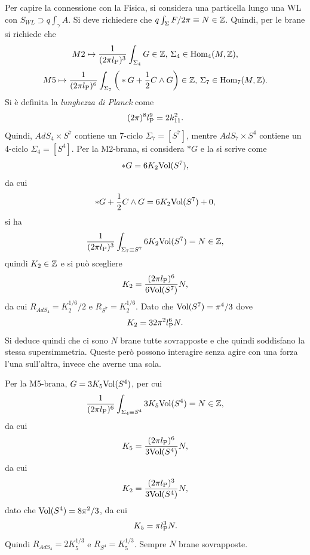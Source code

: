 Per capire la connessione con la Fisica, si considera una particella lungo una WL con $S_{WL} \supset q\int_\gamma A$. Si deve richiedere che $q\int_\Sigma F/2\pi \equiv N \in \mathbb{Z}$. Quindi, per le brane si richiede che 
\begin{equation}
    M2 \mapsto \frac{1}{(2\pi l_{\mathrm{P}})^3}\int_{\Sigma_4} G \in \mathbb{Z},\,\Sigma_4 \in \mathrm{Hom_{4}}(M,\mathbb{Z}),
\end{equation}
\begin{equation}
    M5 \mapsto \frac{1}{(2\pi l_{\mathrm{P}})^6}\int_{\Sigma_7} \bigg(*G + \frac{1}{2}C \wedge G\bigg) \in \mathbb{Z},\,\Sigma_7 \in \mathrm{Hom_{7}}(M,\mathbb{Z}).
\end{equation}
Si è definita la \emph{lunghezza di Planck} come 
\begin{equation}
    (2\pi)^8l_{\mathrm{P}}^9 = 2k_{11}^2.
\end{equation}
Quindi, $AdS_4 \times S^7$ contiene un 7-ciclo $\Sigma_7 = [S^7]$, mentre $AdS_7 \times S^4$ contiene un 4-ciclo $\Sigma_4 = [S^4]$. Per la M2-brana, si considera $*G$ e la si scrive come 
\begin{equation}
    *G = 6K_2\mathrm{Vol}(S^7),
\end{equation}
da cui 
\begin{equation}
    *G + \frac{1}{2}C \wedge G = 6K_2\mathrm{Vol}(S^7) + 0,
\end{equation}
si ha 
\begin{equation}
    \frac{1}{(2\pi l_{\mathrm{P}})^3}\int_{\Sigma_7 \equiv S^7} 6K_2\mathrm{Vol}(S^7) = N \in \mathbb{Z},
\end{equation}
quindi $K_2 \in \mathbb{Z}$ e si può scegliere
\begin{equation}
    K_2 = \frac{(2\pi l_{\mathrm{P}})^6}{6\mathrm{Vol}(S^7)}N,
\end{equation}
da cui $R_{AdS_4} = K_2^{1/6}/2$ e $R_{S^7} = K_2^{1/6}$. Dato che $\mathrm{Vol}(S^7) = \pi^4/3$ dove 
\begin{equation}
    K_2 = 32\pi^2l_{\mathrm{P}}^6N.
\end{equation}
Si deduce quindi che ci sono $N$ brane tutte sovrapposte e che quindi soddisfano la stessa supersimmetria. Queste però possono interagire senza agire con una forza l'una sull'altra, invece che averne una sola. 

Per la M5-brana, $G = 3K_5\mathrm{Vol}(S^4)$, per cui 
\begin{equation}
    \frac{1}{(2\pi l_{\mathrm{P}})^6}\int_{\Sigma_4 \equiv S^4} 3K_5\mathrm{Vol}(S^4) = N \in \mathbb{Z},
\end{equation}
da cui 
\begin{equation}
    K_5 = \frac{(2\pi l_{\mathrm{P}})^6}{3\mathrm{Vol}(S^4)}N,
\end{equation}
da cui 
\begin{equation}
    K_2 = \frac{(2\pi l_{\mathrm{P}})^3}{3\mathrm{Vol}(S^4)}N,
\end{equation}
dato che $\mathrm{Vol}(S^4) = 8\pi^2/3$, da cui 
\begin{equation}
    K_5 = \pi l_{\mathrm{P}}^3N.
\end{equation}
Quindi $R_{AdS_4} = 2K_5^{1/3}$ e $R_{S^4} = K_5^{1/3}$. Sempre $N$ brane sovrapposte. 

